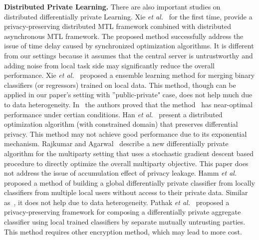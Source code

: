 \textbf{Distributed Private Learning.} 
There are also important studies on distributed differentially private Learning. Xie {\it et al.}~\cite{xie2017privacy} for the first time, provide a privacy-preserving distributed MTL framework combined with distributed asynchronous MTL framework. The proposed method successfully address the issue of time delay caused by synchronized optimization algorithms. It is different from our settings because it assumes that the central server is untrustworthy and adding noise from local task side may significantly reduce the overall performance. Xie {\it et al.}~\cite{xie2016data} proposed a ensemble learning method for merging binary classifiers (or regressors) trained on local data. This method, though can be applied in our paper's setting with ''public-private" case, does not help much due to data heterogeneity. In~\cite{xie2016comparison} the authors proved that the method~\cite{xie2016data} has near-optimal performance under certian conditions. Han {\it et al.}~\cite{han2017differentially} present a distributed optimization algorithm (with constrained domain) that preserves differential privacy. This method may not achieve good performance due to its exponential mechanism. Rajkumar and Agarwal~\cite{rajkumar2012differentially} describe a new differentially private algorithm for the multiparty setting that uses a stochastic gradient descent based procedure to directly optimize the overall multiparty objective. This paper does not address the issue of accumulation effect of privacy leakage. Hamm {\it et al.}~\cite{hamm2016learning} proposed a method of building a global
differentially private classifier from locally classifiers from multiple local users without access to their private data. Similar as~\cite{xie2016data}, it does not help due to data heterogeneity. Pathak {\it et al.}~\cite{pathak2010multiparty} proposed a privacy-preserving framework for composing a differentially private aggregate
classifier using local trained classifiers by separate mutually untrusting
parties. This method requires other encryption method, which may lead to more cost.

